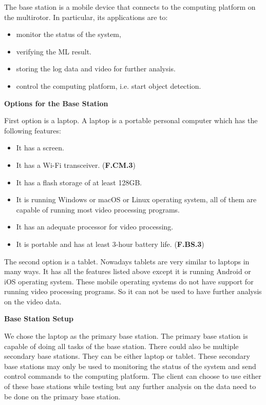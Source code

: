The base station is a mobile device that connects to the computing platform on the multirotor. In particular, its applications are to:
\begin{itemize}
    \item monitor the status of the system,
    \item verifying the ML result.
    \item storing the log data and video for further analysis.
    \item control the computing platform, i.e. start object detection.
\end{itemize}

\textbf{Options for the Base Station}

First option is a laptop. A laptop is a portable personal computer which has the following features:
\begin{itemize}
    \item It has a screen.
    \item It has a Wi-Fi transceiver. (\textbf{F.CM.3})
    \item It has a flash storage of at least 128GB.
    \item It is running Windows or macOS or Linux operating system, all of them are capable of running most video processing programs.
    \item It has an adequate processor for video processing.
    \item It is portable and has at least 3-hour battery life. (\textbf{F.BS.3})
\end{itemize}

The second option is a tablet. Nowadays tablets are very similar to laptops in many ways. It has all the features listed above except it is running Android or iOS operating system. These mobile operating systems do not have support for running video processing programs. So it can not be used to have further analysis on the video data.

\textbf{Base Station Setup}

We chose the laptop as the primary base station. The primary base station is capable of doing all tasks of the base station. There could also be multiple secondary base stations. They can be either laptop or tablet. These secondary base stations may only be used to monitoring the status of the system and send control commands to the computing platform. The client can choose to use either of these base stations while testing but any further analysis on the data need to be done on the primary base station.

